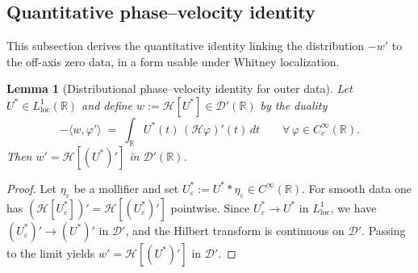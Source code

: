 \documentclass[11pt]{amsart}
\newtheorem{lemma}[theorem]{Lemma}
\theoremstyle{definition}
\theoremstyle{remark}
\newcommand{\Hilb}{\mathcal H}
\begin{document}
\subsection{Quantitative phase--velocity identity}

\label{appA:phasevelocity}
This subsection derives the quantitative identity linking the distribution $-w'$ to the off-axis zero data, in a form usable under Whitney localization.
\begin{lemma}[Distributional phase--velocity identity for outer data]\label{lem:pv-distributional}
Let \(U^*\in L^1_{\mathrm{loc}}(\mathbb R)\) and define \(w:=\Hilb[U^*]\in\mathcal D'(\mathbb R)\) by the duality
\[
  -\langle w,\varphi'\rangle \;=\; \int_{\mathbb R} U^*(t)\,(\Hilb\varphi)'(t)\,dt\qquad\forall\,\varphi\in C_c^\infty(\mathbb R).
\]
Then \(w'=\Hilb[(U^*)']\) in \(\mathcal D'(\mathbb R)\).
\end{lemma}
\begin{proof}
Let \(\eta_\varepsilon\) be a mollifier and set \(U_\varepsilon^*:=U^**\eta_\varepsilon\in C^\infty(\mathbb R)\).
For smooth data one has \((\Hilb[U_\varepsilon^*])'=\Hilb[(U_\varepsilon^*)']\) pointwise.
Since \(U_\varepsilon^*\to U^*\) in \(L^1_{\mathrm{loc}}\), we have \((U_\varepsilon^*)'\to (U^*)'\) in \(\mathcal D'\), and the Hilbert transform is continuous on \(\mathcal D'\).
Passing to the limit yields \(w'=\Hilb[(U^*)']\) in \(\mathcal D'\).
\end{proof}
\end{document}
